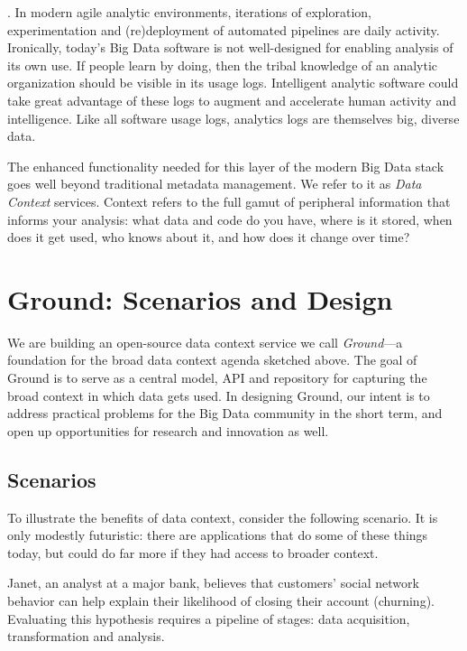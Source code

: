 \documentclass{sig-alternate}
\begin{document}
. In modern agile analytic environments, iterations of exploration, experimentation and (re)deployment of automated pipelines are daily activity. Ironically, today's Big Data software is not well-designed for enabling analysis of its own use. If people learn by doing, then the tribal knowledge of an analytic organization should be visible in its usage logs. Intelligent analytic software could take great advantage of these logs to augment and accelerate human activity and intelligence. Like all software usage logs, analytics logs are themselves big, diverse data.

\smallitembot
The enhanced functionality needed for this layer of the modern Big Data stack goes well beyond traditional metadata management. We refer to it as \emph{Data Context} services. Context refers to the full gamut of peripheral information that informs your analysis: what data and code do you have, where is it stored, when does it get used, who knows about it, and how does it change over time?  

\section{Ground: Scenarios and Design}
We are building an open-source data context service we call \emph{Ground}---a foundation for the broad data context agenda sketched above. 
The goal of Ground is to serve as a central model, API and repository for capturing the broad context in which data gets used. In designing Ground, our intent is to address practical problems for the Big Data community in the short term, and open up opportunities for research and innovation as well.

\subsection{Scenarios}
\label{sec:scenarios}
To illustrate the benefits of data context, consider the following scenario. It is only modestly futuristic: there are applications that do some of these things today, but could do far more if they had access to broader context.

  Janet, an analyst at a major bank, believes that customers' social network behavior can help explain their likelihood of closing their account (churning). Evaluating this hypothesis requires a pipeline of stages: data acquisition, transformation and analysis. 
\end{document}
